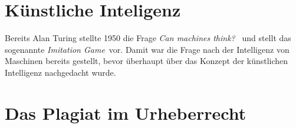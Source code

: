 \documentclass{article}
\begin{document}
\section{Künstliche Inteligenz}
Bereits Alan Turing stellte 1950 die Frage \glqq \textit{Can machines think?}\grqq~\autocite[\ppno~433]{turingCOMPUTINGMACHINERYINTELLIGENCE1950} und stellt das sogenannte \glqq \textit{Imitation Game}\grqq~vor. Damit war die Frage nach der Intelligenz von Maschinen bereits gestellt, bevor überhaupt über das Konzept der künstlichen Intelligenz nachgedacht wurde\autocite[\ppno~10]{laemmelKuenstlicheIntelligenzWissensverarbeitung2023}. 
\section{Das Plagiat im Urheberrecht}
\printbibliography
\end{document}
